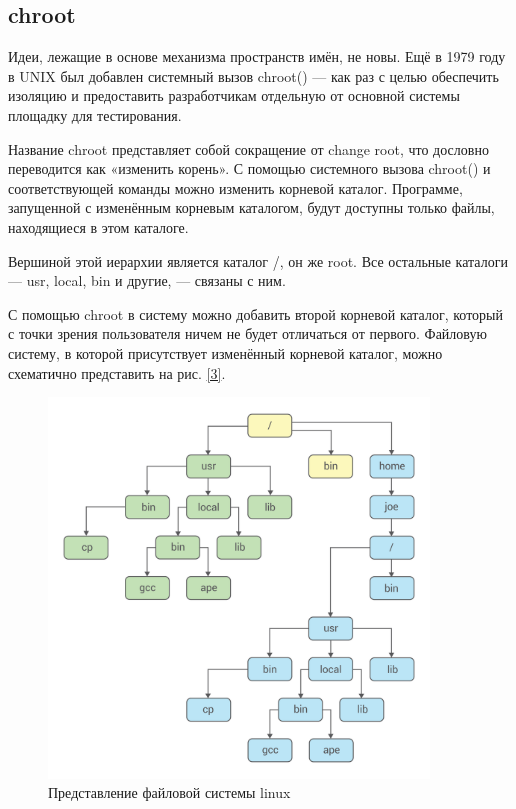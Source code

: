 	\subsection{chroot}
	
	Идеи, лежащие в основе механизма пространств имён, не новы. Ещё в 1979 году в UNIX был добавлен системный вызов chroot() — как раз с целью обеспечить изоляцию и предоставить разработчикам отдельную от основной системы площадку для тестирования. 
	
	Название chroot представляет собой сокращение от change root, что дословно переводится как «изменить корень». С помощью системного вызова chroot() и соответствующей команды можно изменить корневой каталог. Программе, запущенной с изменённым корневым каталогом, будут доступны только файлы, находящиеся в этом каталоге. 
	
	Вершиной этой иерархии является каталог /, он же root. Все остальные каталоги — usr, local, bin и другие, — связаны с ним.

С помощью chroot в систему можно добавить второй корневой каталог, который с точки зрения пользователя ничем не будет отличаться от первого. Файловую систему, в которой присутствует изменённый корневой каталог, можно схематично представить на рис. \ref{3}.

\begin{figure}[h!]
\centering
\includegraphics[width=0.9\textwidth]{img/chroot.png}
\caption{Представление файловой системы linux}
\label{fig3}
\end{figure}

